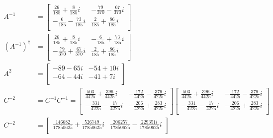 \documentclass{article}
\begin{document}
            \begin{align*}
                A^{-1} &= 
                \begin{bmatrix}
                    \frac{26}{185} + \frac{8}{185}i & -\frac{79}{370} - \frac{67}{370}i\\
                    -\frac{6}{185} - \frac{73}{185}i & \frac{2}{185} + \frac{86}{185}i\\
                \end{bmatrix}
                \\
                (A^{-1})^{\dagger} &= 
                \begin{bmatrix}
                    \frac{26}{185} + \frac{8}{185}i & -\frac{6}{185} + \frac{73}{185}i\\
                    -\frac{79}{370} + \frac{67}{370}i & \frac{2}{185} + \frac{86}{185}i\\
                \end{bmatrix}
                \\
                A^2 &= 
                \begin{bmatrix}
                    -89-65i & -54+10i\\
                    -64-44i & -41+7i\\
                \end{bmatrix}
                \\
                C^{-2} &= C^{-1}C^{-1} = 
                \begin{bmatrix}
                    \frac{503}{4425} + \frac{396}{4425}i & -\frac{172}{4425} - \frac{379}{4225}i\\
                    -\frac{331}{4225} - \frac{17}{4225}i & -\frac{206}{4225} + \frac{283}{4225}i\\
                \end{bmatrix}
                \begin{bmatrix}
                    \frac{503}{4425} + \frac{396}{4425}i & -\frac{172}{4425} - \frac{379}{4225}i\\
                    -\frac{331}{4225} - \frac{17}{4225}i & -\frac{206}{4225} + \frac{283}{4225}i\\
                \end{bmatrix}
                \\
                C^{-2} &= 
                \begin{bmatrix}
                    \frac{146682}{17850625} + \frac{526749}{17850625}i & \frac{206257}{17850625} - \frac{229351i}{17850625}i\\

\end{bmatrix}
\end{align*}
\end{document}
